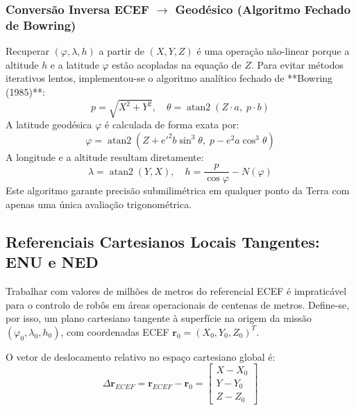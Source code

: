 \documentclass[11pt,a4paper]{article}
\begin{document}
\subsubsection{Conversão Inversa ECEF $\to$ Geodésico (Algoritmo Fechado de Bowring)}
Recuperar $(\varphi, \lambda, h)$ a partir de $(X, Y, Z)$ é uma operação não-linear porque a altitude $h$ e a latitude $\varphi$ estão acopladas na equação de $Z$. Para evitar métodos iterativos lentos, implementou-se o algoritmo analítico fechado de **Bowring (1985)**:
\begin{equation}
    p = \sqrt{X^2 + Y^2}, \quad \theta = \operatorname{atan2}(Z \cdot a, \; p \cdot b)
\end{equation}
A latitude geodésica $\varphi$ é calculada de forma exata por:
\begin{equation}
    \varphi = \operatorname{atan2}\left(Z + e'^2 b \sin^3 \theta, \; p - e^2 a \cos^3 \theta\right)
\end{equation}
A longitude e a altitude resultam diretamente:
\begin{equation}
    \lambda = \operatorname{atan2}(Y, X), \quad h = \frac{p}{\cos\varphi} - N(\varphi)
\end{equation}
Este algoritmo garante precisão submilimétrica em qualquer ponto da Terra com apenas uma única avaliação trigonométrica.

\subsection{Referenciais Cartesianos Locais Tangentes: ENU e NED}
Trabalhar com valores de milhões de metros do referencial ECEF é impraticável para o controlo de robôs em áreas operacionais de centenas de metros. Define-se, por isso, um plano cartesiano tangente à superfície na origem da missão $(\varphi_0, \lambda_0, h_0)$, com coordenadas ECEF $\mathbf{r}_0 = (X_0, Y_0, Z_0)^T$.

O vetor de deslocamento relativo no espaço cartesiano global é:
\begin{equation}
    \Delta\mathbf{r}_{ECEF} = \mathbf{r}_{ECEF} - \mathbf{r}_0 = \begin{bmatrix} X - X_0 \\ Y - Y_0 \\ Z - Z_0 \end{bmatrix}
\end{equation}
\end{document}
